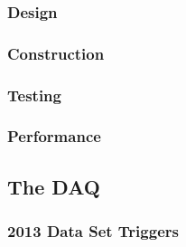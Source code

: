 \subsubsection{Design}
\subsubsection{Construction}
\subsubsection{Testing}
\subsubsection{Performance}
\subsection{The DAQ}
\subsubsection{2013 Data Set Triggers}
